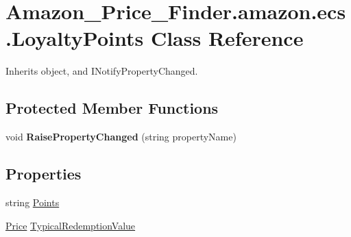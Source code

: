 \hypertarget{class_amazon___price___finder_1_1amazon_1_1ecs_1_1_loyalty_points}{\section{Amazon\-\_\-\-Price\-\_\-\-Finder.\-amazon.\-ecs.\-Loyalty\-Points Class Reference}
\label{class_amazon___price___finder_1_1amazon_1_1ecs_1_1_loyalty_points}
}


 




Inherits object, and I\-Notify\-Property\-Changed.

\subsection*{Protected Member Functions}
\begin{DoxyCompactItemize}
\item 
\hypertarget{class_amazon___price___finder_1_1amazon_1_1ecs_1_1_loyalty_points_a77d1a1e82a777f13f2dd9a7297c54b22}{void {\bfseries Raise\-Property\-Changed} (string property\-Name)}\label{class_amazon___price___finder_1_1amazon_1_1ecs_1_1_loyalty_points_a77d1a1e82a777f13f2dd9a7297c54b22}

\end{DoxyCompactItemize}
\subsection*{Properties}
\begin{DoxyCompactItemize}
\item 
\hypertarget{class_amazon___price___finder_1_1amazon_1_1ecs_1_1_loyalty_points_a674298a256cda1baabd47e015cfd2eaa}{string \hyperlink{class_amazon___price___finder_1_1amazon_1_1ecs_1_1_loyalty_points_a674298a256cda1baabd47e015cfd2eaa}{Points}}\label{class_amazon___price___finder_1_1amazon_1_1ecs_1_1_loyalty_points_a674298a256cda1baabd47e015cfd2eaa}

\begin{DoxyCompactList}\small\item\em \end{DoxyCompactList}\item 
\hypertarget{class_amazon___price___finder_1_1amazon_1_1ecs_1_1_loyalty_points_a871e717608437bc6f595234c41ead4c9}{\hyperlink{class_amazon___price___finder_1_1amazon_1_1ecs_1_1_price}{Price} \hyperlink{class_amazon___price___finder_1_1amazon_1_1ecs_1_1_loyalty_points_a871e717608437bc6f595234c41ead4c9}{Typical\-Redemption\-Value}}\label{class_amazon___price___finder_1_1amazon_1_1ecs_1_1_loyalty_points_a871e717608437bc6f595234c41ead4c9}

\begin{DoxyCompactList}\small\item\em \end{DoxyCompactList}\end{DoxyCompactItemize}
